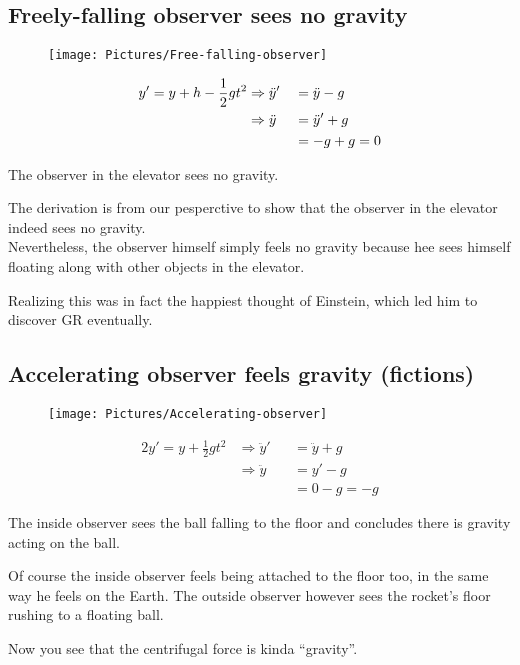 \documentclass[11pt,fleqn]{book} %
\begin{document}
\subsection{Freely-falling observer sees no gravity}
\begin{figure}[h]
\centering\texttt{[image: Pictures/Free-falling-observer]}
\end{figure}
\begin{alignat*}{2}
  y' = y + h - \frac{1}{2}gt^2 &\Rightarrow \ddot{y}' &&= \ddot{y} - g \hfill  \\
                               &\Rightarrow \ddot{y}  &&= \ddot{y}' + g \hfill \\
                               &\                     &&= -g + g = 0 \hfill
\end{alignat*}
\begin{emphbox}
  The observer in the elevator sees no gravity.
\end{emphbox}
\begin{remark}
  The derivation is from our pesperctive to show that the observer in the
  elevator indeed sees no gravity. \\
  Nevertheless, the observer himself simply feels no gravity because hee sees
  himself floating along with other objects in the elevator.
\end{remark}
Realizing this was in fact the happiest thought of Einstein, which led him to
discover GR eventually.

\subsection{Accelerating observer feels gravity (fictions)}
\begin{figure}[h]
\centering\texttt{[image: Pictures/Accelerating-observer]}
\end{figure}
\begin{alignat*}{2}
  y' = y + \frac{1}{2}gt^2 & \Rightarrow \ddot{y}' && = \ddot{y} + g \\
                           & \Rightarrow \ddot{y}  && = y' -g        \\
                           & \                     && = 0-g = -g
\end{alignat*}
\begin{emphbox}
  The inside observer sees the ball falling to the floor and concludes there is
  gravity acting on the ball.
\end{emphbox}
\begin{remark}
  Of course the inside observer feels being attached to the floor too, in the
  same way he feels on the Earth.
  The outside observer however sees the rocket's floor rushing to a floating ball.
\end{remark}
  Now you see that the centrifugal force is kinda ``gravity''.
\end{document}
